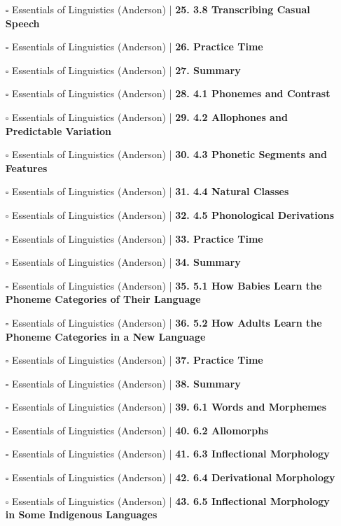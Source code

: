 \documentclass[a4, landscape, 12pt]{article}
\newcommand{\checkbox}{$\square$}%
\begin{document}
\begin{itemize}
{}
\item [\checkbox]  Essentials of Linguistics (Anderson) | \textbf{ 25. 3.8 Transcribing Casual Speech
}
\item [\checkbox]  Essentials of Linguistics (Anderson) | \textbf{ 26. Practice Time
}
\item [\checkbox]  Essentials of Linguistics (Anderson) | \textbf{ 27. Summary
}
\item [\checkbox]  Essentials of Linguistics (Anderson) | \textbf{ 28. 4.1 Phonemes and Contrast
}
\item [\checkbox]  Essentials of Linguistics (Anderson) | \textbf{ 29. 4.2 Allophones and Predictable Variation
}
\item [\checkbox]  Essentials of Linguistics (Anderson) | \textbf{ 30. 4.3 Phonetic Segments and Features
}
\item [\checkbox]  Essentials of Linguistics (Anderson) | \textbf{ 31. 4.4 Natural Classes
}
\item [\checkbox]  Essentials of Linguistics (Anderson) | \textbf{ 32. 4.5 Phonological Derivations
}
\item [\checkbox]  Essentials of Linguistics (Anderson) | \textbf{ 33. Practice Time
}
\item [\checkbox]  Essentials of Linguistics (Anderson) | \textbf{ 34. Summary
}
\item [\checkbox]  Essentials of Linguistics (Anderson) | \textbf{ 35. 5.1 How Babies Learn the Phoneme Categories of Their Language
}
\item [\checkbox]  Essentials of Linguistics (Anderson) | \textbf{ 36. 5.2 How Adults Learn the Phoneme Categories in a New Language
}
\item [\checkbox]  Essentials of Linguistics (Anderson) | \textbf{ 37. Practice Time
}
\item [\checkbox]  Essentials of Linguistics (Anderson) | \textbf{ 38. Summary
}
\item [\checkbox]  Essentials of Linguistics (Anderson) | \textbf{ 39. 6.1 Words and Morphemes
}
\item [\checkbox]  Essentials of Linguistics (Anderson) | \textbf{ 40. 6.2 Allomorphs
}
\item [\checkbox]  Essentials of Linguistics (Anderson) | \textbf{ 41. 6.3 Inflectional Morphology
}
\item [\checkbox]  Essentials of Linguistics (Anderson) | \textbf{ 42. 6.4 Derivational Morphology
}
\item [\checkbox]  Essentials of Linguistics (Anderson) | \textbf{ 43. 6.5 Inflectional Morphology in Some Indigenous Languages
}
\end{itemize}
\end{document}
